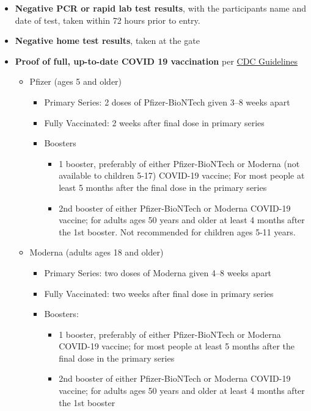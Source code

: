 \begin{itemize}[noitemsep]
    \item \textbf{Negative PCR or rapid lab test results}, with the participants name and date of test, taken within 72 hours prior to entry.
    \item \textbf{Negative home test results}, taken at the gate
    \item \textbf{Proof of full, up-to-date COVID 19 vaccination }per \href{https://www.cdc.gov/coronavirus/2019-ncov/vaccines/stay-up-to-date.html}{CDC Guidelines}
    \begin{itemize}
        \item Pfizer (ages 5 and older)
        \begin{itemize}
            \item Primary Series: 2 doses of Pfizer-BioNTech given 3–8 weeks apart
            \item Fully Vaccinated: 2 weeks after final dose in primary series
            \item Boosters
            \begin{itemize}
                \item 1 booster, preferably of either Pfizer-BioNTech or Moderna (not available to children 5-17) COVID-19 vaccine; For most people at least 5 months after the final dose in the primary series
                \item 2nd booster of either Pfizer-BioNTech or Moderna COVID-19 vaccine; for adults ages 50 years and older at least 4 months after the 1st booster. Not recommended for children ages 5-11 years.
            \end{itemize}
        \end{itemize}
        \item Moderna (adults ages 18 and older)
        \begin{itemize}
            \item Primary Series: two doses of Moderna given 4--8 weeks apart
            \item Fully Vaccinated: two weeks after final dose in primary series
            \item Boosters:
            \begin{itemize}
                \item 1 booster, preferably of either Pfizer-BioNTech or Moderna COVID-19 vaccine; for most people at least 5 months after the final dose in the primary series
                \item 2nd booster of either Pfizer-BioNTech or Moderna COVID-19 vaccine; for adults ages 50 years and older at least 4 months after the 1st booster

\end{itemize}
\end{itemize}
\end{itemize}
\end{itemize}
